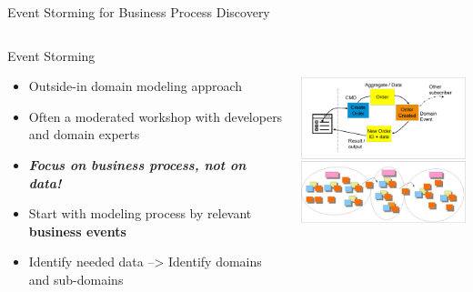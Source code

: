 \begin{frame}{Event Storming for Business Process Discovery}
\begin{columns}
\begin{column}{.4\textwidth}
\begin{block}{Event Storming}
    \vspace{-3mm}
    \small
    \begin{itemize}
	\item Outside-in domain modeling approach
        \item Often a moderated workshop with developers and domain experts
	\item \textbf{\textit{Focus on business process, not on data!}}
	\end {itemize}
    \vspace{-3mm}
\end{block}
\vspace{-3mm}
   \small
   \begin{itemize}
        \item Start with modeling process by relevant \textbf{business events}
        \item Identify needed data --> Identify domains and sub-domains
    \end{itemize}
    \vfill
\end{column}
\begin{column}{.58\textwidth}
    \includegraphics[height=60mm]{../MicroServiceDesign/images/EventStorming3}
\end{column}
\end{columns}
\end{frame}


